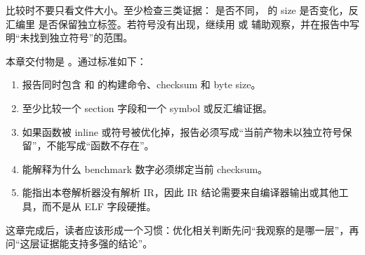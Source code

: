 比较时不要只看文件大小。至少检查三类证据： 是否不同， 的 size 是否变化，反汇编里  是否保留独立标签。若符号没有出现，继续用  或  辅助观察，并在报告中写明“未找到独立符号”的范围。


本章交付物是 。通过标准如下：

\begin{enumerate}
  \item 报告同时包含  和  的构建命令、checksum 和 byte size。
  \item 至少比较一个 section 字段和一个 symbol 或反汇编证据。
  \item 如果函数被 inline 或符号被优化掉，报告必须写成“当前产物未以独立符号保留”，不能写成“函数不存在”。
  \item 能解释为什么 benchmark 数字必须绑定当前 checksum。
  \item 能指出本卷解析器没有解析 IR，因此 IR 结论需要来自编译器输出或其他工具，而不是从 ELF 字段硬推。
\end{enumerate}

这章完成后，读者应该形成一个习惯：优化相关判断先问“我观察的是哪一层”，再问“这层证据能支持多强的结论”。
